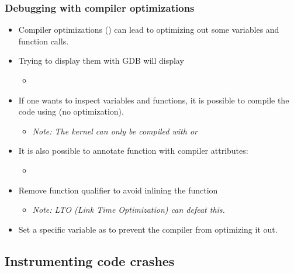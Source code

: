\begin{frame}[fragile]
  \frametitle{Debugging with compiler optimizations}
  \begin{itemize}
    \item Compiler optimizations () can lead to optimizing out some variables
          and function calls.
    \item Trying to display them with GDB will display
    \begin{itemize}
      \item {}
    \end{itemize}
    \item If one wants to inspect variables and functions, it is possible to
          compile the code using  (no optimization).
    \begin{itemize}
      \item {\em Note: The kernel can only be compiled with  or }
    \end{itemize}
    \item It is also possible to annotate function with compiler attributes:
    \begin{itemize}
      \item {}
    \end{itemize}
    \item Remove function  qualifier to avoid inlining the function
    \begin{itemize}
      \item {\em Note: LTO (Link Time Optimization) can defeat this.}
    \end{itemize}
    \item Set a specific variable as  to prevent the compiler
          from optimizing it out.
  \end{itemize}
\end{frame}

\subsection{Instrumenting code crashes}

